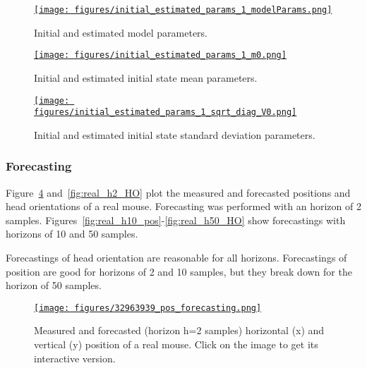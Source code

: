 \documentclass[12pt]{article}
\begin{document}
\begin{figure}
    \centering
    \href{https://www.gatsby.ucl.ac.uk/~rapela/aman/reports/ekfForKinematicsAndHeadOrientation/figures/initial_estimated_params_1_modelParams.html}{\texttt{[image: figures/initial\_estimated\_params\_1\_modelParams.png]}}

    \caption{Initial and estimated model parameters.}

    \label{fig:realData_model_params}
\end{figure}

\begin{figure}
    \centering
    \href{https://www.gatsby.ucl.ac.uk/~rapela/aman/reports/ekfForKinematicsAndHeadOrientation/figures/initial_estimated_params_1_m0.html}{\texttt{[image: figures/initial\_estimated\_params\_1\_m0.png]}}

    \caption{Initial and estimated initial state mean parameters.}

    \label{fig:realData_m0_params}
\end{figure}

\begin{figure}
    \centering
    \href{https://www.gatsby.ucl.ac.uk/~rapela/aman/reports/ekfForKinematicsAndHeadOrientation/figures/initial_estimated_params_1_sqrt_diag_V0.html}{\texttt{[image: figures/initial\_estimated\_params\_1\_sqrt\_diag\_V0.png]}}

    \caption{Initial and estimated initial state standard deviation parameters.}

    \label{fig:realData_sqrt_diag_V0_params}
\end{figure}

\subsubsection*{Forecasting}

Figure~\ref{fig:real_h2_pos} and~\ref{fig:real_h2_HO} plot the measured and
forecasted positions and head orientations of a real mouse. Forecasting was
performed with an horizon of 2 samples.
%
Figures~\ref{fig:real_h10_pos}-\ref{fig:real_h50_HO} show forecastings with
horizons of 10 and 50 samples.

Forecastings of head orientation are reasonable for all horizons. Forecastings
of position are good for horizons of 2 and 10 samples, but they break down for
the horizon of 50 samples.

\begin{figure}
    \centering
    \href{https://www.gatsby.ucl.ac.uk/~rapela/aman/reports/ekfForKinematicsAndHeadOrientation/figures/32963939_pos_forecasting.html}{\texttt{[image: figures/32963939\_pos\_forecasting.png]}}
    \caption{Measured and forecasted (horizon h=2 samples) horizontal (x) and
    vertical (y) position of a real mouse. Click on the image to get its
    interactive version.}
    \label{fig:real_h2_pos}
\end{figure}
\end{document}
